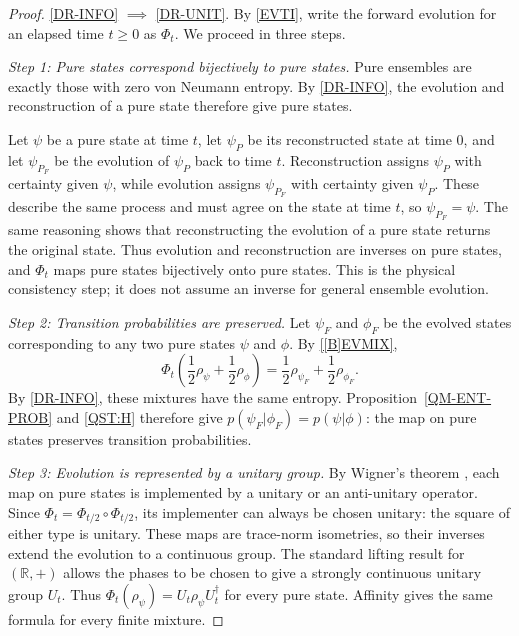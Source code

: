 \documentclass{techbrief}
\begin{document}
\begin{proof}
	\ref{DR-INFO} $\implies$ \ref{DR-UNIT}. By \ref{EVTI}, write the forward evolution for an elapsed time $t\geq0$ as $\Phi_t$. We proceed in three steps.

	\emph{Step 1: Pure states correspond bijectively to pure states.} Pure ensembles are exactly those with zero von Neumann entropy. By \ref{DR-INFO}, the evolution and reconstruction of a pure state therefore give pure states.

	Let $\psi$ be a pure state at time $t$, let $\psi_P$ be its reconstructed state at time $0$, and let $\psi_{P_F}$ be the evolution of $\psi_P$ back to time $t$. Reconstruction assigns $\psi_P$ with certainty given $\psi$, while evolution assigns $\psi_{P_F}$ with certainty given $\psi_P$. These describe the same process and must agree on the state at time $t$, so $\psi_{P_F}=\psi$. The same reasoning shows that reconstructing the evolution of a pure state returns the original state. Thus evolution and reconstruction are inverses on pure states, and $\Phi_t$ maps pure states bijectively onto pure states. This is the physical consistency step; it does not assume an inverse for general ensemble evolution.

	\emph{Step 2: Transition probabilities are preserved.} Let $\psi_F$ and $\phi_F$ be the evolved states corresponding to any two pure states $\psi$ and $\phi$. By \ref{[B]EVMIX},
	\begin{equation*}
		\Phi_t\left(\frac{1}{2}\rho_\psi+\frac{1}{2}\rho_\phi\right)=\frac{1}{2}\rho_{\psi_F}+\frac{1}{2}\rho_{\phi_F}.
	\end{equation*}
	By \ref{DR-INFO}, these mixtures have the same entropy. Proposition~\ref{QM-ENT-PROB} and \ref{QST:H} therefore give $p(\psi_F|\phi_F)=p(\psi|\phi)$: the map on pure states preserves transition probabilities.

	\emph{Step 3: Evolution is represented by a unitary group.} By Wigner's theorem \cite[Theorem~5.29]{Landsman2017}, each map on pure states is implemented by a unitary or an anti-unitary operator. Since $\Phi_t=\Phi_{t/2}\circ\Phi_{t/2}$, its implementer can always be chosen unitary: the square of either type is unitary. These maps are trace-norm isometries, so their inverses extend the evolution to a continuous group. The standard lifting result for $(\mathbb{R},+)$ \cite[Theorem~5.59]{Landsman2017} allows the phases to be chosen to give a strongly continuous unitary group $U_t$. Thus $\Phi_t(\rho_\psi)=U_t\rho_\psi U_t^\dagger$ for every pure state. Affinity gives the same formula for every finite mixture.


\end{proof}
\end{document}
